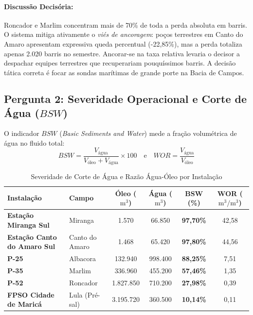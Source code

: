 \documentclass[12pt,a4paper]{article}
\begin{document}
\paragraph{Discussão Decisória:} Roncador e Marlim concentram mais de 70\% de toda a perda absoluta em barris. O sistema mitiga ativamente o \textit{viés de ancoragem}: poços terrestres em Canto do Amaro apresentam expressiva queda percentual (-22,85\%), mas a perda totaliza apenas 2.020 barris no semestre. Ancorar-se na taxa relativa levaria o decisor a despachar equipes terrestres que recuperariam pouquíssimos barris. A decisão tática correta é focar as sondas marítimas de grande porte na Bacia de Campos.

\subsection{Pergunta 2: Severidade Operacional e Corte de Água ($BSW$)}
O indicador $BSW$ (\textit{Basic Sediments and Water}) mede a fração volumétrica de água no fluido total:
\begin{equation}
    BSW = \frac{V_{\text{água}}}{V_{\text{óleo}} + V_{\text{água}}} \times 100 \quad \text{e} \quad WOR = \frac{V_{\text{água}}}{V_{\text{óleo}}}
\end{equation}

\begin{table}[htbp]
\centering
\small
\caption{Severidade de Corte de Água e Razão Água-Óleo por Instalação}
\label{tab:p2}
\begin{tabular}{llcccc}
\toprule
\textbf{Instalação} & \textbf{Campo} & \textbf{Óleo ($\text{m}^3$)} & \textbf{Água ($\text{m}^3$)} & \textbf{BSW (\%)} & \textbf{WOR ($\text{m}^3/\text{m}^3$)} \\
\midrule
\textbf{Estação Miranga Sul} & Miranga & 1.570 & 66.850 & \textbf{97,70\%} & 42,58 \\
\textbf{Estação Canto do Amaro Sul} & Canto do Amaro & 1.468 & 65.420 & \textbf{97,80\%} & 44,56 \\
\textbf{P-25} & Albacora & 132.940 & 998.400 & \textbf{88,25\%} & 7,51 \\
\textbf{P-35} & Marlim & 336.960 & 455.200 & \textbf{57,46\%} & 1,35 \\
\textbf{P-52} & Roncador & 1.827.850 & 710.200 & \textbf{27,98\%} & 0,39 \\
\textbf{FPSO Cidade de Maricá} & Lula (Pré-sal) & 3.195.720 & 360.500 & \textbf{10,14\%} & 0,11 \\
\bottomrule
\end{tabular}
\end{table}
\end{document}
